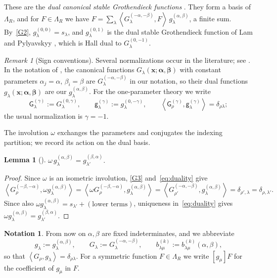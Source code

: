 \documentclass[11pt]{amsart}
\DeclareRobustCommand{\S}{\ensuremath{\mathsection}}
\numberwithin{equation}{section}
\newtheorem{lemma}[theorem]{Lemma}
\theoremstyle{definition}
\newtheorem{notation}[theorem]{Notation}
\theoremstyle{remark}
\newtheorem{remark}[theorem]{Remark}
\newcommand{\Lam}{\Lambda}
\newcommand{\bbeta}{\boldsymbol\beta}
\newcommand{\balpha}{\boldsymbol\alpha}
\newcommand{\Hall}[2]{\left\langle #1,#2\right\rangle}
\newcommand{\sG}{\mathsf G}
\newcommand{\sg}{\mathsf g}
\begin{document}
These are the \emph{dual canonical stable Grothendieck functions}
\cite[Def.~6.1]{Yeliussizov}. They form a basis of $\Lam_R$, and for
$F\in\Lam_R$ we have
$F=\sum_\lambda\Hall{G^{(-\alpha,-\beta)}_\lambda}{F}\,g^{(\alpha,\beta)}_\lambda$,
a finite sum. By~\ref{G2}, $g^{(0,0)}_\lambda=s_\lambda$, and
$g^{(0,1)}_\lambda$ is the dual stable Grothendieck function of Lam and
Pylyavskyy \cite{LamPylyavskyy}, which is Hall dual to $G^{(0,-1)}_\lambda$.

\begin{remark}[Sign conventions]\label{rem:signs}
Several normalizations occur in the literature; see
\cite[Table~1]{IMS25}. In the notation of \cite{Kim-adv, IMS25}, the canonical
functions $G_\lambda(\mathbf x;\balpha,\bbeta)$ with constant parameters
$\alpha_j=\alpha$, $\beta_i=\beta$ are $G^{(-\alpha,-\beta)}_\lambda$ in our
notation, so their dual functions $g_\lambda(\mathbf x;\balpha,\bbeta)$ are our
$g^{(\alpha,\beta)}_\lambda$. For the one-parameter theory we write
\begin{equation}\label{eq:one-parameter-translation}
 \sG^{(\gamma)}_\lambda:=G^{(0,\gamma)}_\lambda,
 \qquad
 \sg^{(\gamma)}_\lambda:=g^{(0,-\gamma)}_\lambda,
 \qquad
 \Hall{\sG^{(\gamma)}_\rho}{\sg^{(\gamma)}_\lambda}=\delta_{\rho\lambda};
\end{equation}
the usual normalization is $\gamma=-1$.
\end{remark}
The involution $\omega$ exchanges the parameters and conjugates
the indexing partition; we record its action on the dual basis.

\begin{lemma}[{\cite[\S6]{Yeliussizov}}]\label{lem:omega-g}
$\omega\,g^{(\alpha,\beta)}_\lambda=g^{(\beta,\alpha)}_{\lambda'}$.
\end{lemma}

\begin{proof}
Since $\omega$ is an isometric involution, \ref{G3} and~\eqref{eq:duality} give
\[
 \Hall{G^{(-\beta,-\alpha)}_\rho}{\omega g^{(\alpha,\beta)}_\lambda}
 =\Hall{\omega G^{(-\beta,-\alpha)}_\rho}{g^{(\alpha,\beta)}_\lambda}
 =\Hall{G^{(-\alpha,-\beta)}_{\rho'}}{g^{(\alpha,\beta)}_\lambda}
 =\delta_{\rho',\lambda}=\delta_{\rho,\lambda'} .
\]
Since also $\omega g^{(\alpha,\beta)}_\lambda=s_{\lambda'}+(\text{lower terms})$,
uniqueness in~\eqref{eq:duality} gives
$\omega g^{(\alpha,\beta)}_\lambda=g^{(\beta,\alpha)}_{\lambda'}$.
\end{proof}

\begin{notation}\label{not:abbrev}
From now on $\alpha,\beta$ are fixed indeterminates, and we abbreviate
\[
 g_\lambda:=g^{(\alpha,\beta)}_\lambda,
 \qquad
 G_\lambda:=G^{(-\alpha,-\beta)}_\lambda,
 \qquad
 b^{(k)}_{\lambda\mu}:=b^{(k)}_{\lambda\mu}(\alpha,\beta),
\]
so that $\Hall{G_\rho}{g_\lambda}=\delta_{\rho\lambda}$. For a symmetric
function $F\in\Lam_R$ we write $[g_\mu]F$ for the coefficient of $g_\mu$ in
$F$.
\end{notation}
\end{document}
